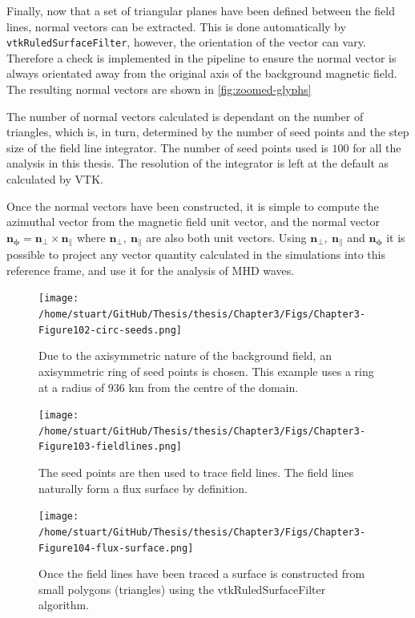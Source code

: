 \documentclass[a4paper,12pt,fourier,authoryear,custommargin]{Classes/PhDThesisPSnPDF}
\renewcommand{\vec}{\mathbf}
\begin{document}
Finally, now that a set of triangular planes have been defined between the field lines, normal vectors can be extracted.
This is done automatically by\\ \verb|vtkRuledSurfaceFilter|, however, the orientation of the vector can vary.
Therefore a check is implemented in the pipeline to ensure the normal vector is always orientated away from the original axis of the background magnetic field.
The resulting normal vectors are shown in \cref{fig:zoomed-glyphs}

The number of normal vectors calculated is dependant on the number of triangles, which is, in turn, determined by the number of seed points and the step size of the field line integrator.
The number of seed points used is $100$ for all the analysis in this thesis.
The resolution of the integrator is left at the default as calculated by VTK.

Once the normal vectors have been constructed, it is simple to compute the azimuthal vector from the magnetic field unit vector, and the normal vector $\vec{n_\phi}= \vec{n_\perp} \times \vec{n_\parallel}$ where $\vec{n_\perp},\ \vec{n_\parallel} $ are also both unit vectors.
Using  $\vec{n_\perp},\ \vec{n_\parallel}$ and $\vec{n_\phi}$ it  is possible to project any vector quantity calculated in the simulations into this reference frame, and use it for the analysis of MHD waves.



\begin{figure}[H]
    \centering
    \texttt{[image: /home/stuart/GitHub/Thesis/thesis/Chapter3/Figs/Chapter3-Figure102-circ-seeds.png]}
    \caption{Due to the axisymmetric nature of the background field, an axisymmetric ring of seed points is chosen. This example uses a ring at a radius of $936$ km from the centre of the domain.}
    \label{fig:circ-seeds}
\end{figure}

\begin{figure}[H]
    \centering
    \texttt{[image: /home/stuart/GitHub/Thesis/thesis/Chapter3/Figs/Chapter3-Figure103-fieldlines.png]}
    \caption{The seed points are then used to trace field lines. The field lines naturally form a flux surface by definition.}
    \label{fig:fieldlines}
\end{figure}

\begin{figure}[H]
    \centering
    \texttt{[image: /home/stuart/GitHub/Thesis/thesis/Chapter3/Figs/Chapter3-Figure104-flux-surface.png]}
    \caption{Once the field lines have been traced a surface is constructed from small polygons (triangles) using the vtkRuledSurfaceFilter algorithm.}
    \label{fig:flux-surface}
\end{figure}
\end{document}
